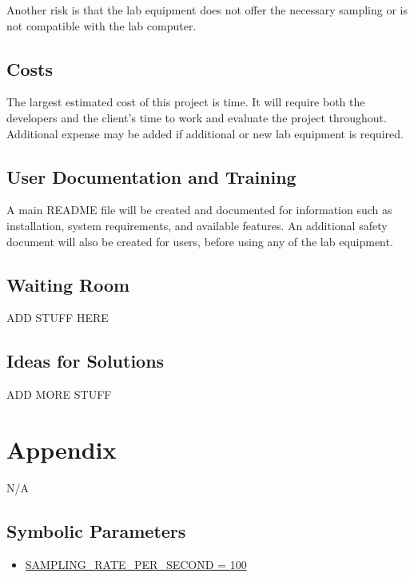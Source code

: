 \documentclass[12pt, titlepage]{article}
\begin{document}
Another risk is that the lab equipment does not offer the necessary sampling or is not compatible with the lab computer. 

\subsection{Costs}
The largest estimated cost of this project is time. It will require both the developers and the client's time to work and evaluate the project throughout.
Additional expense may be added if additional or new lab equipment is required. 

\subsection{User Documentation and Training}
A main README file will be created and documented for information such as installation, system requirements, and available features. 
An additional safety document will also be created for users, before using any of the lab equipment. 

\subsection{Waiting Room}
ADD STUFF HERE

\subsection{Ideas for Solutions}
ADD MORE STUFF





\newpage

\section{Appendix}

N/A

\subsection{Symbolic Parameters}

\begin{itemize}
    \color{red}
    \item \hyperref[sec:sampling]{SAMPLING\_RATE\_PER\_SECOND = 100}
\end{itemize}
\end{document}
